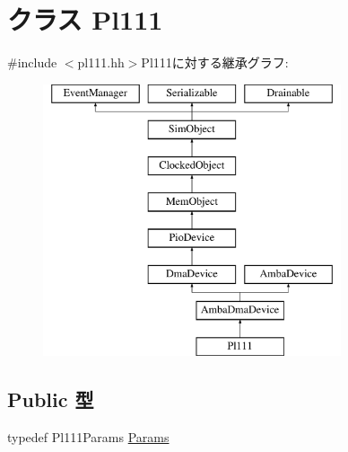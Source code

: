\hypertarget{classPl111}{
\section{クラス Pl111}
\label{classPl111}
}


{\ttfamily \#include $<$pl111.hh$>$}Pl111に対する継承グラフ:\begin{figure}[H]
\begin{center}
\leavevmode
\includegraphics[height=8cm]{classPl111}
\end{center}
\end{figure}
\subsection*{Public 型}
\begin{DoxyCompactItemize}
\item 
typedef Pl111Params \hyperlink{classPl111_a98df8e62be26dfc2009a7e53d5d0841d}{Params}
\end{DoxyCompactItemize}
